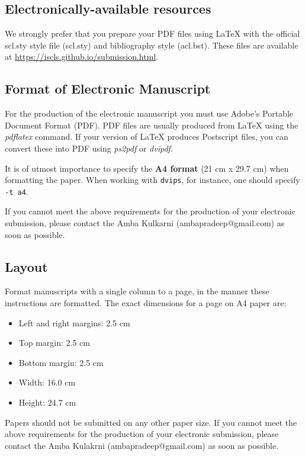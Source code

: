 \documentclass[11pt]{article}
\begin{document}
\subsection{Electronically-available resources}

We strongly prefer that you prepare your PDF files using \LaTeX{} with
the official scl.sty style file (scl.sty) and bibliography style
(acl.bst). These files are available at
\url{https://iscls.github.io/submission.html}.


\subsection{Format of Electronic Manuscript}
\label{sect:pdf}

For the production of the electronic manuscript you must use Adobe's
Portable Document Format (PDF). PDF files are usually produced from
\LaTeX{} using the \textit{pdflatex} command. If your version of
\LaTeX{} produces Postscript files, you can convert these into PDF
using \textit{ps2pdf} or \textit{dvipdf}.

It is of utmost importance to specify the \textbf{A4 format} (21 cm
x 29.7 cm) when formatting the paper. When working with
{\tt dvips}, for instance, one should specify {\tt -t a4}.

If you cannot meet the above requirements for the
production of your electronic submission, please contact the
Amba Kulkarni (ambapradeep@gmail.com) as soon as possible.

\subsection{Layout}
\label{ssec:layout}

Format manuscripts with a single column to a page, in the manner these
instructions are formatted. The exact dimensions for a page on A4
paper are:

\begin{itemize}
\item Left and right margins: 2.5 cm
\item Top margin: 2.5 cm
\item Bottom margin: 2.5 cm
\item Width: 16.0 cm
\item Height: 24.7 cm
\end{itemize}

\noindent Papers should not be submitted on any other paper size.
If you cannot meet the above requirements for
the production of your electronic submission, please contact the
Amba Kulakrni (ambapradeep@gmail.com) as soon as possible.
\end{document}
